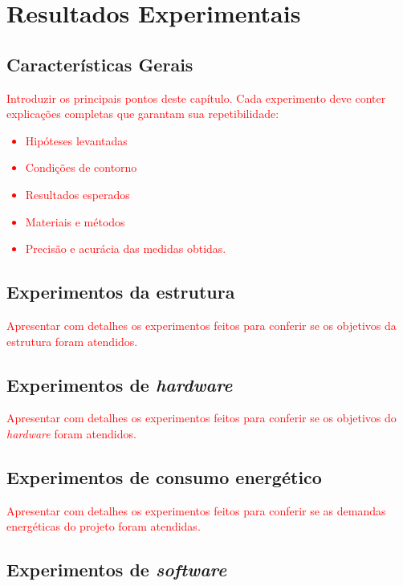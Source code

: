 \chapter{Resultados Experimentais}

\section{Características Gerais}

\textcolor{red}{Introduzir os principais pontos deste capítulo. Cada experimento deve conter explicações completas que garantam sua repetibilidade:
\begin{itemize}
    \item Hipóteses levantadas
    \item Condições de contorno
    \item Resultados esperados
    \item Materiais e métodos
    \item Precisão e acurácia das medidas obtidas.
\end{itemize}
}

\section{Experimentos da estrutura}

\textcolor{red}{Apresentar com detalhes os experimentos feitos para conferir se os objetivos da estrutura foram atendidos.}

\section{Experimentos de \textit{hardware}}

\textcolor{red}{Apresentar com detalhes os experimentos feitos para conferir se os objetivos do \textit{hardware} foram atendidos.}

\section{Experimentos de consumo energético}

\textcolor{red}{Apresentar com detalhes os experimentos feitos para conferir se as demandas energéticas do projeto foram atendidas.}

\section{Experimentos de \textit{software}}

